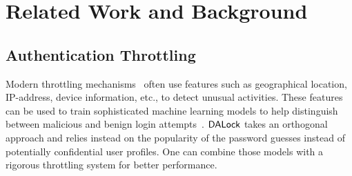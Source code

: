 
\vspace*{-\baselineskip}

\section{Related Work and Background}\label{sec: relatedwork}

\vspace*{-\baselineskip}

\subsection{Authentication Throttling} \label{related: Throttling}

\vspace*{-\baselineskip}

 Modern throttling mechanisms~\cite{sandhu2005system, gordon2014efficiently} often use features such as geographical location, IP-address, device information, etc., to detect unusual activities. These features can be used to train sophisticated machine learning models to help distinguish between malicious and benign login attempts~\cite{NDSS:FJDBG16}. $\mathsf{DALock}$ takes an orthogonal approach and relies instead on the popularity of the password guesses instead of potentially confidential user profiles. One can combine those models with a rigorous throttling system for better performance.


